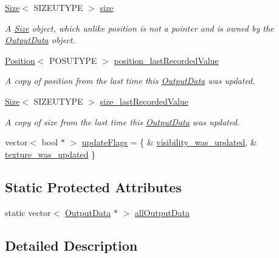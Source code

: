 \begin{DoxyCompactItemize}
\hyperlink{struct_size}{Size}$<$ S\-I\-Z\-E\-U\-T\-Y\-P\-E $>$ \hyperlink{struct_output_data_aa0cfd47e41dd6e32a43b10cecdcbeb2b}{size}
\begin{DoxyCompactList}\small\item\em A \hyperlink{struct_size}{Size} object, which unlike position is not a pointer and is owned by the \hyperlink{struct_output_data}{Output\-Data} object. \end{DoxyCompactList}\item 
\hyperlink{struct_position}{Position}$<$ P\-O\-S\-U\-T\-Y\-P\-E $>$ \hyperlink{struct_output_data_a21ec70c5ab2418a33e9c6293dd9b588d}{position\-\_\-last\-Recorded\-Value}
\begin{DoxyCompactList}\small\item\em A copy of position from the last time this \hyperlink{struct_output_data}{Output\-Data} was updated. \end{DoxyCompactList}\item 
\hyperlink{struct_size}{Size}$<$ S\-I\-Z\-E\-U\-T\-Y\-P\-E $>$ \hyperlink{struct_output_data_a3007edb5d6739619f9e6b3f8ae8e5be1}{size\-\_\-last\-Recorded\-Value}
\begin{DoxyCompactList}\small\item\em A copy of size from the last time this \hyperlink{struct_output_data}{Output\-Data} was updated. \end{DoxyCompactList}\item 
vector$<$ bool $\ast$ $>$ \hyperlink{struct_output_data_a490cb05683b60fb16e696652b0c040d6}{update\-Flags} = \{ \& \hyperlink{struct_output_data_a0f15b2dc64531dfd8dd0925840c4758e}{visibility\-\_\-was\-\_\-updated}, \& \hyperlink{struct_output_data_aa35a2457b23d1a6843ec49c2f6a4b29a}{texture\-\_\-was\-\_\-updated} \}
\end{DoxyCompactItemize}
\subsection*{Static Protected Attributes}
\begin{DoxyCompactItemize}
\item 
static vector$<$ \hyperlink{struct_output_data}{Output\-Data} $\ast$ $>$ \hyperlink{struct_output_data_ad515b68d5527925323d98113f08b5d8f}{all\-Output\-Data}
\end{DoxyCompactItemize}


\subsection{Detailed Description}
